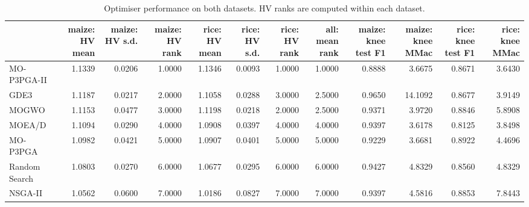 \begin{table}[htbp]
\centering
\caption{Optimiser performance on both datasets. HV ranks are computed within each dataset.}
\label{tab:crossdataset}
\footnotesize
\begin{tabular}{lrrrrrrrrrrr}
\toprule
 & maize: HV mean & maize: HV s.d. & maize: HV rank & rice: HV mean & rice: HV s.d. & rice: HV rank & all: mean rank & maize: knee test F1 & maize: knee MMac & rice: knee test F1 & rice: knee MMac \\
\midrule
MO-P3PGA-II & 1.1339 & 0.0206 & 1.0000 & 1.1346 & 0.0093 & 1.0000 & 1.0000 & 0.8888 & 3.6675 & 0.8671 & 3.6430 \\
GDE3 & 1.1187 & 0.0217 & 2.0000 & 1.1058 & 0.0288 & 3.0000 & 2.5000 & 0.9650 & 14.1092 & 0.8677 & 3.9149 \\
MOGWO & 1.1153 & 0.0477 & 3.0000 & 1.1198 & 0.0218 & 2.0000 & 2.5000 & 0.9371 & 3.9720 & 0.8846 & 5.8908 \\
MOEA/D & 1.1094 & 0.0290 & 4.0000 & 1.0908 & 0.0397 & 4.0000 & 4.0000 & 0.9397 & 3.6178 & 0.8125 & 3.8498 \\
MO-P3PGA & 1.0982 & 0.0421 & 5.0000 & 1.0907 & 0.0401 & 5.0000 & 5.0000 & 0.9229 & 3.6681 & 0.8922 & 4.4696 \\
Random Search & 1.0803 & 0.0270 & 6.0000 & 1.0677 & 0.0295 & 6.0000 & 6.0000 & 0.9427 & 4.8329 & 0.8560 & 4.8329 \\
NSGA-II & 1.0562 & 0.0600 & 7.0000 & 1.0186 & 0.0827 & 7.0000 & 7.0000 & 0.9397 & 4.5816 & 0.8853 & 7.8443 \\
\bottomrule
\end{tabular}
\end{table}
